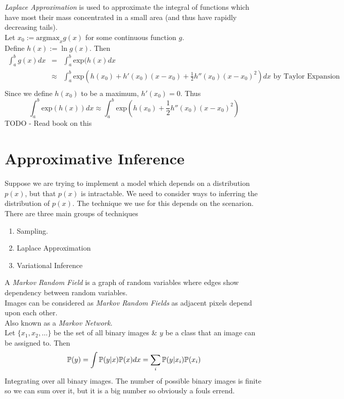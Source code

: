 \documentclass[11pt,a4paper]{article}
\begin{document}
\textit{Laplace Approximation} is used to approximate the integral of functions which have most their mass concentrated in a small area (and thus have rapidly decreasing tails).\\
Let $x_0:=\text{argmax}_xg(x)$ for some continuous function $g$.\\
Define $h(x):=\ln g(x)$. Then
\[\begin{array}{rcl}
\displaystyle\int_a^bg(x)dx&=&{\displaystyle\int_a^b\text{exp}(h(x)dx}\\
&\approx&{\displaystyle\int_a^b\text{exp}\left(h(x_0)+h'(x_0)(x-x_0)+\frac{1}{2}h''(x_0)(x-x_0)^2\right)dx\text{ by Taylor Expansion}}\\
\end{array}\]
Since we define $h(x_0)$ to be a maximum, $h'(x_0)=0$. Thus
$$\int_a^b\text{exp}(h(x))dx\approx\int_a^b\text{exp}\left(h(x_0)+\frac{1}{2}h''(x_0)(x-x_0)^2\right)$$
TODO - Read book on this

\section{Approximative Inference}

Suppose we are trying to implement a model which depends on a distribution $p(x)$, but that $p(x)$ is intractable. We need to consider ways to inferring the distribution of $p(x)$. The technique we use for this depends on the scenarion. There are three main groups of techniques
\begin{enumerate}
	\item Sampling.
	\item Laplace Approximation
	\item Variational Inference
\end{enumerate}

A \textit{Markov Random Field} is a graph of random variables where edges show dependency between random variables.\\
Images can be considered as \textit{Markov Random Fields} as adjacent pixels depend upon each other.\\
\nb Also known as a \textit{Markov Network}.\\

Let $\{x_1,x_2,\dots\}$ be the set of all binary images \& $y$ be a class that an image can be assigned to. Then
$$\mathbb{P}(y)=\int\mathbb{P}(y|x)\mathbb{P}(x)dx=\sum_i\mathbb{P}(y|x_i)\mathbb{P}(x_i)$$
\ie Integrating over all binary images. The number of possible binary images is finite so we can sum over it, but it is a big number so obviously a fouls errend.\\
\end{document}

